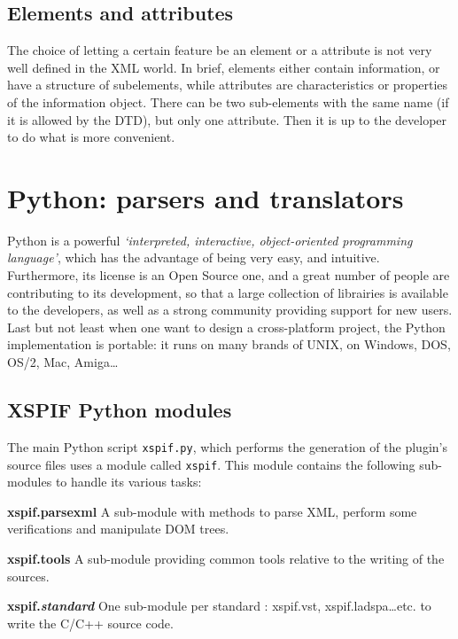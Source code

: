 \subsection{Elements and attributes}
\noindent The choice of letting a certain feature be an element or a attribute is not very well defined in the XML world. In brief, elements either contain information, or have a structure of subelements, while attributes are characteristics or properties of the information object. There can be two sub-elements with the same name (if it is allowed by the DTD), but only one attribute. Then it is up to the developer to do what is more convenient.

\section{Python: parsers and translators}

\noindent Python \cite{python:site} is a powerful
\textit{`interpreted, interactive, object-oriented programming language'}, which has the advantage of being very easy, and intuitive. Furthermore, its license is an Open Source one, and a great number of people are contributing to its development, so that a large collection of librairies is available to the developers, as well as a strong community providing support for new users.\\

\noindent Last but not least when one want to design a cross-platform project, the Python implementation is portable: it runs on many brands of UNIX, on Windows, DOS, OS/2, Mac, Amiga\ldots \\

\subsection{XSPIF Python modules}

\noindent The main Python script \verb|xspif.py|, which performs the generation of the plugin's source files uses a module called \verb|xspif|. This module contains the following sub-modules to handle its various tasks:
\begin{description}
\item \textbf{xspif.parsexml} A sub-module with methods to parse XML,
  perform some verifications and manipulate DOM trees.
\item \textbf{xspif.tools} A sub-module providing common tools relative to the writing of the sources.
\item \textbf{xspif.\textit{standard}} One sub-module per standard : xspif.vst, xspif.ladspa\ldots etc. to write the C/C++ source code.
\end{description}


